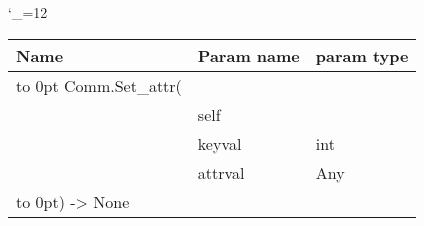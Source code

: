 \begingroup \catcode`\_=12 \tt
\begin{tabular}{lll}
\toprule
\textrm{Name}&\textrm{Param name}&\textrm{param type}\\
\midrule
\hbox to 0pt {Comm.Set_attr(\hss}\\
& self\\
& keyval & int\\
& attrval & Any\\
\hbox to 0pt{) -> None\hss}\\
\bottomrule
\end{tabular}
\endgroup

